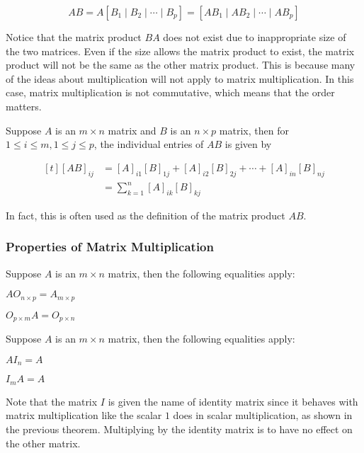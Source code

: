 \documentclass[a4paper,12pt]{article}
\begin{document}
$$AB=A[B_{1}\!\mid\!B_{2}\!\mid\!\cdots\!\mid\!B_{p}]=[AB_{1}\!\mid\!AB_{2}\!\mid\!\cdots\!\mid\!AB_{p}]$$\s

Notice that the matrix product $BA$ does not exist due to inappropriate size of the two matrices. Even if the size allows the matrix product to exist, the matrix product will not be the same as the other matrix product. This is because many of the ideas about multiplication will not apply to matrix multiplication. In this case, matrix multiplication is not commutative, which means that the order matters.\n

\begin{pst}
  Suppose $A$ is an $m\times n$ matrix and $B$ is an $n\times p$ matrix, then for $1\leq i\leq m, 1\leq j\leq p$, the individual entries of $AB$ is given by

  $$\begin{aligned}[t]
    [AB]_{ij}&=[A]_{i1}[B]_{1j}+[A]_{i2}[B]_{2j}+\cdots+[A]_{in}[B]_{nj}\\
    &=\sum_{k=1}^{n}[A]_{ik}[B]_{kj}
  \end{aligned}$$
\end{pst}\n

In fact, this is often used as the definition of the matrix product $AB$.

\subsubsection{Properties of Matrix Multiplication}
\begin{pst}
  Suppose $A$ is an $m\times n$ matrix, then the following equalities apply:
  \begin{alist}
    \item $AO_{n\times p}=A_{m\times p}$
    \item $O_{p\times m}A=O_{p\times n}$
  \end{alist}
\end{pst}\n

\begin{pst}
  Suppose $A$ is an $m\times n$ matrix, then the following equalities apply:
  \begin{alist}
    \item $AI_{n}=A$
    \item $I_{m}A=A$
  \end{alist}
\end{pst}\n

Note that the matrix $I$ is given the name of identity matrix since it behaves with matrix multiplication like the scalar $1$ does in scalar multiplication, as shown in the previous theorem. Multiplying by the identity matrix is to have no effect on the other matrix.\n
\end{document}
